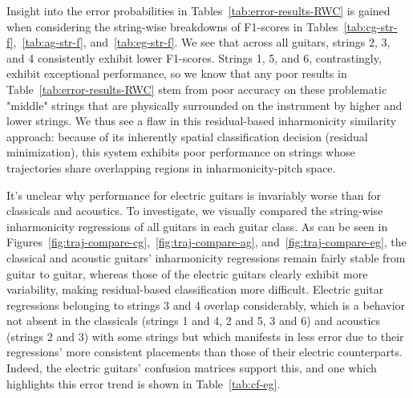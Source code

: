 \documentclass[12pt]{cmuthesis}
\begin{document}
Insight into the error probabilities in Tables~\ref{tab:error-results-RWC} is gained when considering the string-wise breakdowns of F1-scores in Tables~\ref{tab:cg-str-f},~\ref{tab:ag-str-f}, and~\ref{tab:eg-str-f}. We see that across all guitars, strings 2, 3, and 4 consistently exhibit lower F1-scores. Strings 1, 5, and 6, contrastingly, exhibit exceptional performance, so we know that any poor results in Table~\ref{tab:error-results-RWC} stem from poor accuracy on these problematic "middle" strings that are physically surrounded on the instrument by higher and lower strings. We thus see a flaw in this residual-based inharmonicity similarity approach: because of its inherently spatial classification decision (residual minimization), this system exhibits poor performance on strings whose trajectories share overlapping regions in inharmonicity-pitch space.

It's unclear why performance for electric guitars is invariably worse than for classicals and acoustics. To investigate, we visually compared the string-wise inharmonicity regressions of all guitars in each guitar class. As can be seen in Figures~\ref{fig:traj-compare-cg},~\ref{fig:traj-compare-ag}, and~\ref{fig:traj-compare-eg}, the classical and acoustic guitars' inharmonicity regressions remain fairly stable from guitar to guitar, whereas those of the electric guitars clearly exhibit more variability, making residual-based classification more difficult. Electric guitar regressions belonging to strings 3 and 4 overlap considerably, which is a behavior not absent in the classicals (strings 1 and 4, 2 and 5, 3 and 6) and acoustics (strings 2 and 3) with some strings but which manifests in less error due to their regressions' more consistent placements than those of their electric counterparts. Indeed, the electric guitars' confusion matrices support this, and one which highlights this error trend is shown in Table~\ref{tab:cf-eg}. 
\end{document}
